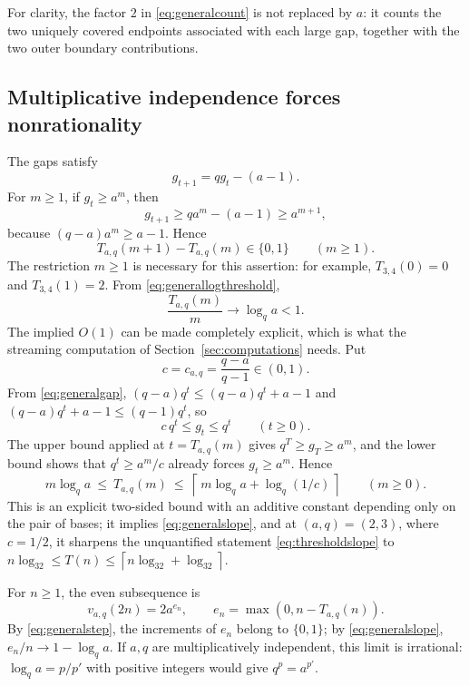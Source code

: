 \documentclass[11pt,letterpaper]{article}
\numberwithin{equation}{section}
\theoremstyle{definition}
\theoremstyle{remark}
\newcommand{\ceil}[1]{\left\lceil#1\right\rceil}
\begin{document}
For clarity, the factor $2$ in \eqref{eq:generalcount} is not replaced by
$a$: it counts the two uniquely covered endpoints associated with each
large gap, together with the two outer boundary contributions.

\subsection{Multiplicative independence forces nonrationality}
\label{sec:genindep}
The gaps satisfy
\begin{equation}\label{eq:gaprec}
 g_{t+1}=qg_t-(a-1).
\end{equation}
For $m\ge1$, if $g_t\ge a^m$, then
\[
 g_{t+1}\ge qa^m-(a-1)\ge a^{m+1},
\]
because $(q-a)a^m\ge a-1$. Hence
\begin{equation}\label{eq:generalstep}
 T_{a,q}(m+1)-T_{a,q}(m)\in\{0,1\}\qquad(m\ge1).
\end{equation}
The restriction $m\ge1$ is necessary for this assertion: for example,
$T_{3,4}(0)=0$ and $T_{3,4}(1)=2$.
From \eqref{eq:generallogthreshold},
\begin{equation}\label{eq:generalslope}
 \frac{T_{a,q}(m)}{m}\longrightarrow\log_q a<1.
\end{equation}
The implied $O(1)$ can be made completely explicit, which is what the
streaming computation of Section~\ref{sec:computations} needs. Put
\begin{equation}\label{eq:gapconstant}
 c=c_{a,q}=\frac{q-a}{q-1}\in(0,1).
\end{equation}
From \eqref{eq:generalgap}, $(q-a)q^t\le(q-a)q^t+a-1$ and
$(q-a)q^t+a-1\le(q-1)q^t$, so
\begin{equation}\label{eq:gapsandwich}
 c\,q^t\le g_t\le q^t\qquad(t\ge0).
\end{equation}
The upper bound applied at $t=T_{a,q}(m)$ gives $q^{T}\ge g_T\ge a^m$, and
the lower bound shows that $q^t\ge a^m/c$ already forces $g_t\ge a^m$.
Hence
\begin{equation}\label{eq:effectivethreshold}
 m\log_qa\ \le\ T_{a,q}(m)\ \le\ \ceil{\,m\log_qa+\log_q(1/c)\,}
 \qquad(m\ge0).
\end{equation}
This is an explicit two-sided bound with an additive constant depending
only on the pair of bases; it implies \eqref{eq:generalslope}, and at
$(a,q)=(2,3)$, where $c=1/2$, it sharpens the unquantified statement
\eqref{eq:thresholdslope} to
$n\log_32\le T(n)\le\ceil{n\log_32+\log_32}$.

For $n\ge1$, the even subsequence is
\begin{equation}\label{eq:generaleven}
 v_{a,q}(2n)=2a^{e_n},\qquad
 e_n=\max(0,n-T_{a,q}(n)).
\end{equation}
By \eqref{eq:generalstep}, the increments of $e_n$ belong to $\{0,1\}$;
by \eqref{eq:generalslope}, $e_n/n\to1-\log_q a$.
If $a,q$ are multiplicatively independent, this limit is irrational:
$\log_qa=p/p'$ with positive integers would give $q^p=a^{p'}$.
\end{document}
